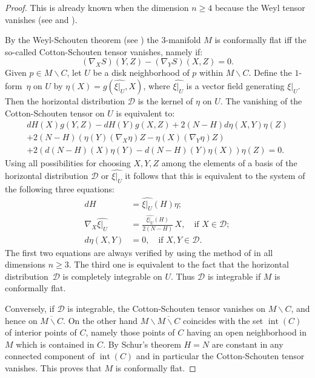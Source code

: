\documentclass[JEP,XML,SOM,Unicode]{cedram}
\let\mathcal\mathscr
\let\moins\smallsetminus
\DeclareMathOperator{\inte}{int}
\theoremstyle{definition}
\theoremstyle{remark}
\numberwithin{equation}{section}
\begin{document}
\begin{proof}
This is already known when the dimension $n\geq4$
because the Weyl tensor vanishes (see \cite[p.\,379]{BF} and \cite{GM}).

By the Weyl-Schouten theorem (see \cite[\S C,\,Th.\,9]{La})
the $3$\nobreakdash-manifold $M$ is conformally flat iff
the so-called Cotton-Schouten tensor vanishes, namely if:
\[ (\nabla_XS)(Y,Z)-(\nabla_YS)(X,Z)=0.\]
Given $p\in M\moins C$, let $U$ be a disk neighborhood of $p$ within $M\moins C$.
Define the $1$\nobreakdash-form~$\eta$ on $U$ by $\eta(X)=g(\widehat{\xi|_U},X)$,
where $\widehat{\xi|_U}$ is a vector field generating $\xi|_U$.
Then the horizontal
distribution $\mathcal D$ is the kernel of $\eta$ on $U$.
The vanishing of the Cotton-Schouten tensor on $U$ is equivalent to:
\begin{multline*}
dH(X)g(Y,Z)-dH(Y)g(X,Z) + 2(N-H) d\eta(X,Y)\eta(Z)\\
+2(N-H)\left(\eta(Y)(\nabla_X\eta)Z-\eta(X)(\nabla_Y\eta)Z\right)\\
+2\left(d(N-H)(X)\eta(Y)-d(N-H)(Y)\eta(X)\right)\eta(Z)=0.
\end{multline*}
Using all possibilities for choosing $X,Y,Z$ among
the elements of a basis of the
horizontal distribution $\mathcal D$ or $\widehat{\xi|_U}$
it follows that this is equivalent to the system of the following three
equations:
\begin{align*}
dH&=\widehat{\xi|_U}(H) \eta;\\
\nabla_{X}\widehat{\xi|_U}&= \frac{\widehat{\xi|_U}(H)}{2(N-H)}\, X, \quad\text{if } X\in \mathcal D;\\
d\eta(X,Y)&=0, \quad\text{if } X,Y\in \mathcal D.
\end{align*}
The first two equations are always verified by using the method of
\cite{BP,GM} in all dimensions $n\geq3$. The third one is equivalent
to the fact that the horizontal distribution~$\mathcal D$
is completely integrable on $U$.
Thus $\mathcal D$ is integrable if $M$ is conformally flat.

Conversely, if $\mathcal D$ is integrable, the Cotton-Schouten tensor vanishes
on $M\moins C$, and hence on $\overline{M\moins C}$. On the other hand
$M\moins {\overline{M\moins C}}$ coincides with the set $\inte (C)$ of interior points of $C$, namely
those points of $C$ having an open neighborhood in $M$ which is contained in $C$.
By Schur's theorem $H=N$ are constant in any connected component of $\inte (C)$ and
in particular the Cotton-Schouten tensor vanishes. This proves that $M$ is conformally flat.
\end{proof}
\end{document}
